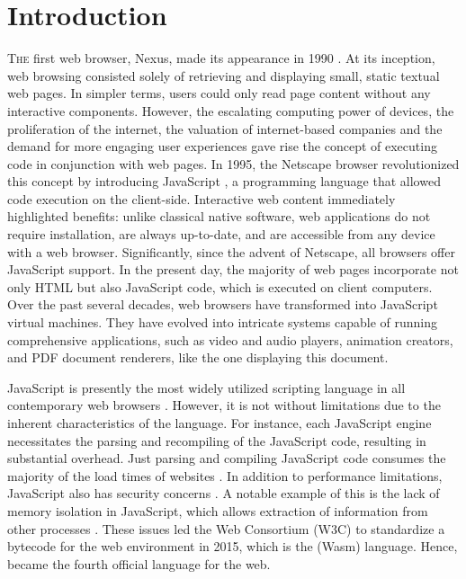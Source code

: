 
\chapter{Introduction}
\label{Intro}


\lettrine[lines=3]{T}{he} first web browser, Nexus, made its appearance in 1990 \cite{nexus}. 
At its inception, web browsing consisted solely of retrieving and displaying small, static textual web pages. 
In simpler terms, users could only read page content without any interactive components. 
However, the escalating computing power of devices, the proliferation of the internet, the valuation of internet-based companies and the demand for more engaging user experiences gave rise the concept of executing code in conjunction with web pages. 
In 1995, the Netscape browser revolutionized this concept by introducing JavaScript \cite{10.1007/978-3-642-14107-2_7}, a programming language that allowed code execution on the client-side.
Interactive web content immediately highlighted benefits: unlike classical native software, web applications do not require installation, are always up-to-date, and are accessible from any device with a web browser. 
Significantly, since the advent of Netscape, all browsers offer JavaScript support. 
In the present day, the majority of web pages incorporate not only HTML but also JavaScript code, which is executed on client computers. 
Over the past several decades, web browsers have transformed into JavaScript virtual machines. 
They have evolved into intricate systems capable of running comprehensive applications, such as video and audio players, animation creators, and PDF document renderers, like the one displaying this document.

JavaScript is presently the most widely utilized scripting language in all contemporary web browsers \cite{mulazzani2013fast}.
However, it is not without limitations due to the inherent characteristics of the language.
For instance, each JavaScript engine necessitates the parsing and recompiling of the JavaScript code, resulting in substantial overhead.
Just parsing and compiling JavaScript code consumes the majority of the load times of websites \cite{clark}.
In addition to performance limitations, JavaScript also has security concerns \cite{10.1145/1190216.1190252}.
A notable example of this is the lack of memory isolation in JavaScript, which allows extraction of information from other processes \cite{10.1145/3412841.3442001}.
These issues led the Web Consortium (W3C) to standardize a bytecode for the web environment in 2015, which is the \Wasm(Wasm) language.
Hence, \Wasm became the fourth official language for the web.



